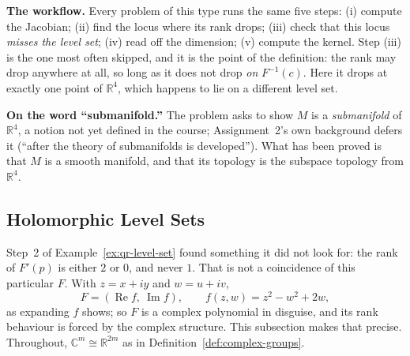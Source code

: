 \documentclass[11pt]{report}
\begin{document}
\begin{rembox}\label{rem:rvt}
\textbf{The workflow.} Every problem of this type runs the same five steps: (i) compute the Jacobian; (ii) find the locus where its rank drops; (iii) check that this locus \emph{misses the level set}; (iv) read off the dimension; (v) compute the kernel. Step (iii) is the one most often skipped, and it is the point of the definition: the rank may drop anywhere at all, so long as it does not drop \emph{on} $F^{-1}(c)$. Here it drops at exactly one point of $\mathbb{R}^4$, which happens to lie on a different level set.
\end{rembox}

\textbf{On the word ``submanifold.''} The problem asks to show $M$ is a \emph{submanifold} of $\mathbb{R}^4$, a notion not yet defined in the course; Assignment~2's own background defers it (``after the theory of submanifolds is developed''). What has been proved is that $M$ is a smooth manifold, and that its topology is the subspace topology from $\mathbb{R}^4$.

\subsection{Holomorphic Level Sets}\label{sub:holomorphic-level-sets}

Step~2 of Example~\ref{ex:qr-level-set} found something it did not look for: the rank of $F'(p)$ is either $2$ or $0$, and never $1$. That is not a coincidence of this particular $F$. With $z = x + iy$ and $w = u + iv$,
\[
F = (\operatorname{Re} f,\ \operatorname{Im} f), \qquad f(z,w) = z^2 - w^2 + 2w,
\]
as expanding $f$ shows; so $F$ is a complex polynomial in disguise, and its rank behaviour is forced by the complex structure. This subsection makes that precise. Throughout, $\mathbb{C}^m \cong \mathbb{R}^{2m}$ as in Definition~\ref{def:complex-groups}.

\begin{center}
\qquad\qquad
{}
\end{center}
\end{document}
